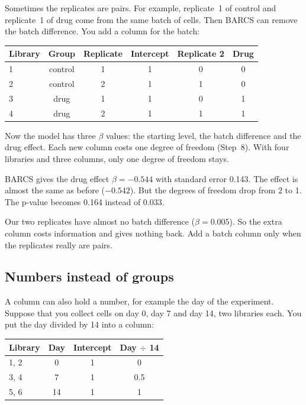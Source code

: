 \documentclass[12pt]{article}
\begin{document}
Sometimes the replicates are pairs. For example, replicate~1 of control and
replicate~1 of drug come from the same batch of cells. Then BARCS can remove
the batch difference. You add a column for the batch:

\begin{center}
\begin{tabular}{lcc|ccc}
\toprule
Library & Group & Replicate & Intercept & Replicate 2 & Drug\\
\midrule
1 & control & 1 & 1 & 0 & 0\\
2 & control & 2 & 1 & 1 & 0\\
3 & drug    & 1 & 1 & 0 & 1\\
4 & drug    & 2 & 1 & 1 & 1\\
\bottomrule
\end{tabular}
\end{center}

Now the model has three $\beta$ values: the starting level, the batch
difference and the drug effect. Each new column costs one degree of freedom
(Step~8). With four libraries and three columns, only one degree of freedom
stays.

\begin{worked}
BARCS gives the drug effect $\beta = -0.544$ with standard error 0.143.
The effect is almost the same as before ($-0.542$). But the degrees of
freedom drop from 2 to 1. The p-value becomes 0.164 instead of 0.033.

Our two replicates have almost no batch difference ($\beta = 0.005$). So
the extra column costs information and gives nothing back. Add a batch
column only when the replicates really are pairs.
\end{worked}

\subsection{Numbers instead of groups}

A column can also hold a number, for example the day of the experiment.
Suppose that you collect cells on day 0, day 7 and day 14, two libraries
each. You put the day divided by 14 into a column:

\begin{center}
\begin{tabular}{lc|cc}
\toprule
Library & Day & Intercept & Day $\div$ 14\\
\midrule
1, 2 & 0  & 1 & 0\\
3, 4 & 7  & 1 & 0.5\\
5, 6 & 14 & 1 & 1\\
\bottomrule
\end{tabular}
\end{center}
\end{document}
